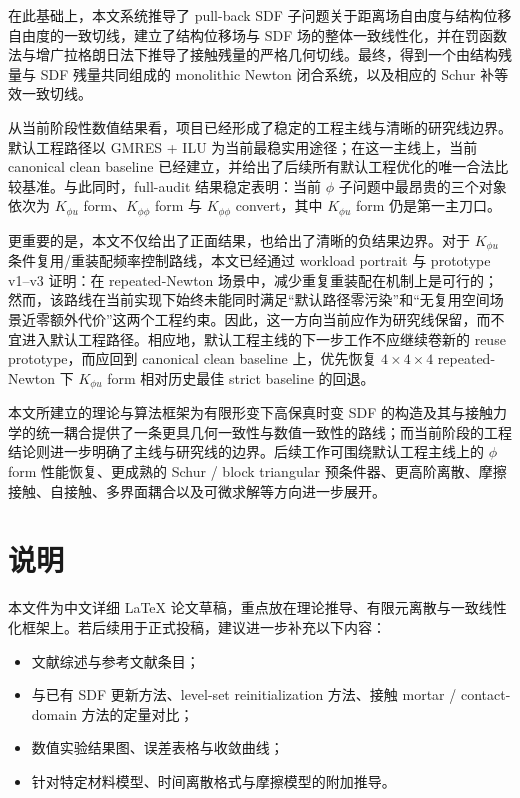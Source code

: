 \documentclass[12pt,a4paper]{ctexart}
\numberwithin{equation}{section}
\begin{document}
在此基础上，本文系统推导了 pull-back SDF 子问题关于距离场自由度与结构位移自由度的一致切线，建立了结构位移场与 SDF 场的整体一致线性化，并在罚函数法与增广拉格朗日法下推导了接触残量的严格几何切线。最终，得到一个由结构残量与 SDF 残量共同组成的 monolithic Newton 闭合系统，以及相应的 Schur 补等效一致切线。

从当前阶段性数值结果看，项目已经形成了稳定的工程主线与清晰的研究线边界。默认工程路径以 GMRES + ILU 为当前最稳实用途径；在这一主线上，当前 canonical clean baseline 已经建立，并给出了后续所有默认工程优化的唯一合法比较基准。与此同时，full-audit 结果稳定表明：当前 $\phi$ 子问题中最昂贵的三个对象依次为 $K_{\phi u}$ form、$K_{\phi\phi}$ form 与 $K_{\phi\phi}$ convert，其中 $K_{\phi u}$ form 仍是第一主刀口。

更重要的是，本文不仅给出了正面结果，也给出了清晰的负结果边界。对于 $K_{\phi u}$ 条件复用/重装配频率控制路线，本文已经通过 workload portrait 与 prototype v1--v3 证明：在 repeated-Newton 场景中，减少重复重装配在机制上是可行的；然而，该路线在当前实现下始终未能同时满足“默认路径零污染”和“无复用空间场景近零额外代价”这两个工程约束。因此，这一方向当前应作为研究线保留，而不宜进入默认工程路径。相应地，默认工程主线的下一步工作不应继续卷新的 reuse prototype，而应回到 canonical clean baseline 上，优先恢复 $4\times4\times4$ repeated-Newton 下 $K_{\phi u}$ form 相对历史最佳 strict baseline 的回退。

本文所建立的理论与算法框架为有限形变下高保真时变 SDF 的构造及其与接触力学的统一耦合提供了一条更具几何一致性与数值一致性的路线；而当前阶段的工程结论则进一步明确了主线与研究线的边界。后续工作可围绕默认工程主线上的 $\phi$ form 性能恢复、更成熟的 Schur / block triangular 预条件器、更高阶离散、摩擦接触、自接触、多界面耦合以及可微求解等方向进一步展开。

\section*{说明}

本文件为中文详细 LaTeX 论文草稿，重点放在理论推导、有限元离散与一致线性化框架上。若后续用于正式投稿，建议进一步补充以下内容：
\begin{itemize}
    \item 文献综述与参考文献条目；
    \item 与已有 SDF 更新方法、level-set reinitialization 方法、接触 mortar / contact-domain 方法的定量对比；
    \item 数值实验结果图、误差表格与收敛曲线；
    \item 针对特定材料模型、时间离散格式与摩擦模型的附加推导。
\end{itemize}
\end{document}
